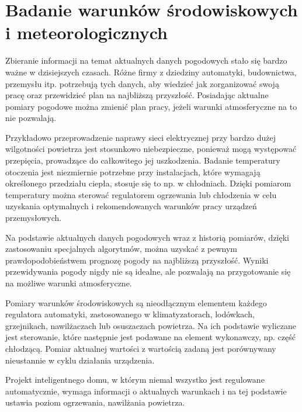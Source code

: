 \chapter{Badanie warunków środowiskowych i meteorologicznych}
Zbieranie informacji na temat aktualnych danych pogodowych stało się bardzo ważne w dzisiejszych czasach. Różne firmy z dziedziny automatyki, budownictwa, przemysłu itp. potrzebują tych danych, aby wiedzieć jak zorganizować swoją pracę oraz przewidzieć plan na najbliższą przyszłość. Posiadając aktualne pomiary pogodowe można zmienić plan pracy, jeżeli warunki atmosferyczne na to nie pozwalają.

Przykładowo przeprowadzenie naprawy sieci elektrycznej przy bardzo dużej wilgotności powietrza jest stosunkowo niebezpieczne, ponieważ mogą występować przepięcia, prowadzące do całkowitego jej uszkodzenia. Badanie temperatury otoczenia jest niezmiernie potrzebne przy instalacjach, które wymagają określonego przedziału ciepła, stosuje się to np. w chłodniach. Dzięki pomiarom temperatury można sterować regulatorem ogrzewania lub chłodzenia w celu uzyskania optymalnych i rekomendowanych warunków pracy urządzeń przemysłowych.

Na podstawie aktualnych danych pogodowych wraz z historią pomiarów, dzięki zastosowaniu specjalnych algorytmów, można uzyskać z pewnym prawdopodobieństwem prognozę pogody na najbliższą przyszłość. Wyniki przewidywania pogody nigdy nie są idealne, ale pozwalają na przygotowanie się na możliwe warunki atmosferyczne.

Pomiary warunków środowiskowych są nieodłącznym elementem każdego regulatora automatyki, zastosowanego w klimatyzatorach, lodówkach, grzejnikach, nawilżaczach lub osuszaczach powietrza. Na ich podstawie wyliczane jest sterowanie, które następnie jest podawane na element wykonawczy, np. część chłodzącą. Pomiar aktualnej wartości z wartością zadaną jest porównywany nieustannie w cyklu działania urządzenia.

Projekt inteligentnego domu, w którym niemal wszystko jest regulowane automatycznie, wymaga informacji o aktualnych warunkach i na tej podstawie ustawia poziom ogrzewania, nawilżania powietrza.
